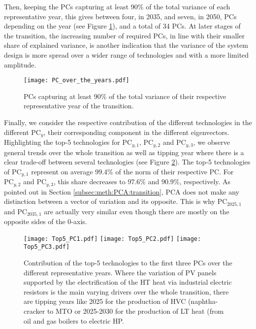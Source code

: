 Then, keeping the \gls{PCs} capturing at least 90\% of the total variance of each representative year, this gives between four, in 2035, and seven, in 2050, \gls{PCs} depending on the year (see Figure \ref{fig:PC_over_the_years}), and a total of 34 \gls{PCs}. At later stages of the transition, the increasing number of required \gls{PCs}, in line with their smaller share of explained variance, is another indication that the variance of the system design is more spread over a wider range of technologies and with a more limited amplitude. 

\begin{figure}[!htbp]
\centering
\texttt{[image: PC\_over\_the\_years.pdf]}
\caption{\gls{PCs} capturing at least 90\% of the total variance of their respective representative year of the transition. }
\label{fig:PC_over_the_years}
\end{figure}

Finally, we consider the respective contribution of the different technologies in the different $\text{PC}_{y}$, \ie their corresponding component in the different eigenvectors. Highlighting the top-5 technologies for $\text{PC}_{y,1}$, $\text{PC}_{y,2}$ and $\text{PC}_{y,3}$, we observe general trends over the whole transition as well as tipping year where there is a clear trade-off between several technologies (see Figure \ref{fig:Top5_PC_year}). The top-5 technologies of $\text{PC}_{y,1}$ represent on average 99.4\% of the norm of their respective PC. For $\text{PC}_{y,2}$ and $\text{PC}_{y,3}$, this share decreases to 97.6\% and 90.9\%, respectively.  As pointed out in Section \ref{subsec:meth:PCA:transition}, \gls{PCA} does not make any distinction between a vector of variation and its opposite. This is why $\text{PC}_{2025,1}$ and $\text{PC}_{2035,1}$ are actually very similar even though there are mostly on the opposite sides of the 0-axis.

\begin{figure}[!htbp]
\centering
\texttt{[image: Top5\_PC1.pdf]}
\texttt{[image: Top5\_PC2.pdf]}
\texttt{[image: Top5\_PC3.pdf]}
\caption{Contribution of the top-5 technologies to the first three \gls{PCs} over the different representative years. Where the variation of \gls{PV} panels supported by the electrification of the \gls{HT} heat via industrial electric resistors is the main varying drivers over the whole transition, there are tipping years like 2025 for the production of \gls{HVC} (\ie naphtha-cracker to \gls{MTO} or 2025-2030 for the production of \gls{LT} heat (\ie from oil and gas boilers to electric \gls{HP}.}
\label{fig:Top5_PC_year}
\end{figure}

